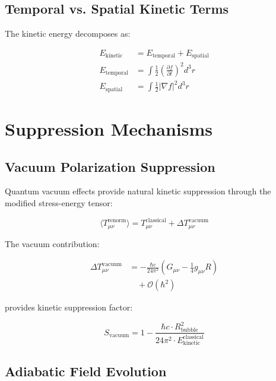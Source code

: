 \documentclass[12pt,a4paper]{article}
\begin{document}
\subsection{Temporal vs. Spatial Kinetic Terms}

The kinetic energy decomposes as:

\begin{align}
E_{\text{kinetic}} &= E_{\text{temporal}} + E_{\text{spatial}} \\
E_{\text{temporal}} &= \int \frac{1}{2}\left(\frac{\partial f}{\partial t}\right)^2 d^3r \\
E_{\text{spatial}} &= \int \frac{1}{2}\left|\nabla f\right|^2 d^3r
\end{align}

\section{Suppression Mechanisms}

\subsection{Vacuum Polarization Suppression}

Quantum vacuum effects provide natural kinetic suppression through the modified stress-energy tensor:

\begin{equation}
\langle T_{\mu\nu}^{\text{renorm}} \rangle = T_{\mu\nu}^{\text{classical}} + \Delta T_{\mu\nu}^{\text{vacuum}}
\end{equation}

The vacuum contribution:

\begin{align}
\Delta T_{\mu\nu}^{\text{vacuum}} &= -\frac{\hbar c}{24\pi^2} \left(G_{\mu\nu} - \frac{1}{4}g_{\mu\nu} R\right) \\
&\quad + \mathcal{O}(\hbar^2)
\end{align}

provides kinetic suppression factor:

\begin{equation}
S_{\text{vacuum}} = 1 - \frac{\hbar c \cdot R_{\text{bubble}}^2}{24\pi^2 \cdot E_{\text{kinetic}}^{\text{classical}}}
\end{equation}

\subsection{Adiabatic Field Evolution}
\end{document}
